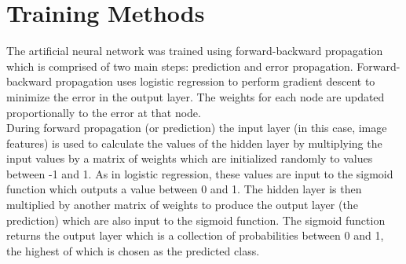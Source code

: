 \documentclass[12pt]{article}
\begin{document}
\section{Training Methods}
The artificial neural network was trained using forward-backward propagation which is comprised of two main steps: prediction and error propagation. Forward-backward propagation uses logistic regression to perform gradient descent to minimize the error in the output layer. The weights for each node are updated proportionally to the error at that node.\\

During forward propagation (or prediction) the input layer (in this case, image features) is used to calculate the values of the hidden layer by multiplying the input values by a matrix of weights which are initialized randomly to values between -1 and 1. As in logistic regression, these values are input to the sigmoid function which outputs a value between 0 and 1. The hidden layer is then multiplied by another matrix of weights to produce the output layer (the prediction) which are also input to the sigmoid function. The sigmoid function returns the output layer which is a collection of probabilities between 0 and 1, the highest of which is chosen as the predicted class.\\
\end{document}
